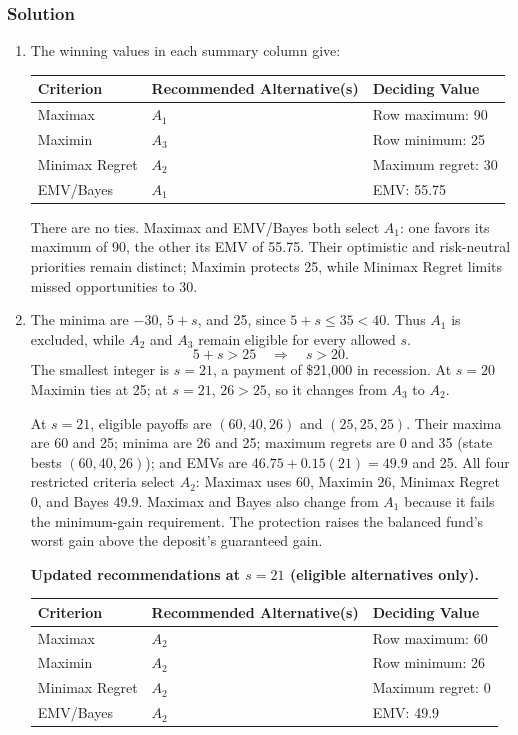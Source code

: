 \subsubsection*{Solution}
\label{subsec:c8-investment-solution}
\begin{enumerate}
\item The winning values in each summary column give:
\begin{center}
\begin{tabular}{lll}\toprule
Criterion & Recommended Alternative(s) & Deciding Value\\\midrule
Maximax & $A_1$ & Row maximum: 90\\
Maximin & $A_3$ & Row minimum: 25\\
Minimax Regret & $A_2$ & Maximum regret: 30\\
EMV/Bayes & $A_1$ & EMV: 55.75\\\bottomrule
\end{tabular}
\end{center}
There are no ties. Maximax and EMV/Bayes both select $A_1$: one favors its maximum of 90, the other its EMV of 55.75. Their optimistic and risk-neutral priorities remain distinct; Maximin protects 25, while Minimax Regret limits missed opportunities to 30.
\item The minima are $-30$, $5+s$, and 25, since $5+s\leq35<40$. Thus $A_1$ is excluded, while $A_2$ and $A_3$ remain eligible for every allowed $s$.
\[
5+s>25\quad\Longrightarrow\quad s>20.
\]
The smallest integer is $\boxed{s=21}$, a payment of \$21,000 in recession. At $s=20$ Maximin ties at 25; at $s=21$, $26>25$, so it changes from $A_3$ to $A_2$.

At $s=21$, eligible payoffs are $(60,40,26)$ and $(25,25,25)$. Their maxima are 60 and 25; minima are 26 and 25; maximum regrets are 0 and 35 (state bests $(60,40,26)$); and EMVs are $46.75+0.15(21)=49.9$ and 25. All four restricted criteria select $A_2$: Maximax uses 60, Maximin 26, Minimax Regret 0, and Bayes 49.9. Maximax and Bayes also change from $A_1$ because it fails the minimum-gain requirement. The protection raises the balanced fund's worst gain above the deposit's guaranteed gain.

\textbf{Updated recommendations at $s=21$ (eligible alternatives only).}
\begin{center}
\begin{tabular}{lll}\toprule
Criterion & Recommended Alternative(s) & Deciding Value\\\midrule
Maximax & $A_2$ & Row maximum: 60\\
Maximin & $A_2$ & Row minimum: 26\\
Minimax Regret & $A_2$ & Maximum regret: 0\\
EMV/Bayes & $A_2$ & EMV: 49.9\\\bottomrule
\end{tabular}
\end{center}
\end{enumerate}

